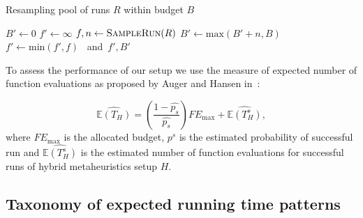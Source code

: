 \documentclass{sig-alternate}
\begin{document}
\begin{algorithm}
\caption{Resampling pool of runs $R$ within budget $B$}
\label{alg:resample}
\begin{algorithmic}[1]
    \State $B' \gets 0$
    \State $f' \gets \infty$
    \Do
        \State $f, n \gets \Call{SampleRun}{R}$%
        \State $B' \gets \mbox{max}(B' + n, B)$
        \State $f' \gets \mbox{min}(f', f)$
    \EndFunction \mbox{ and }\Return $f', B'$
\end{algorithmic}
\end{algorithm}

To assess the performance of our setup we use the measure of expected number of function evaluations as proposed by Auger and Hansen in~\cite{Hansen05performanceevaluation}:

\begin{equation}
    \widehat{\mathbb{E}(T_H)} = \left(\dfrac{1 - \widehat{p_s}}{\widehat{p_s}}\right)FE_{\mbox{max}} + \widehat{\mathbb{E}(T_H^s)},
\end{equation}
where $FE_{\mbox{max}}$ is the allocated budget, $\widehat{p^s}$ is the estimated probability of successful run and $\widehat{\mathbb{E}(T_H^s)}$ is the estimated number of function evaluations for successful runs of hybrid metaheuristics setup $H$.


\subsection{Taxonomy of expected running time patterns}
\end{document}
